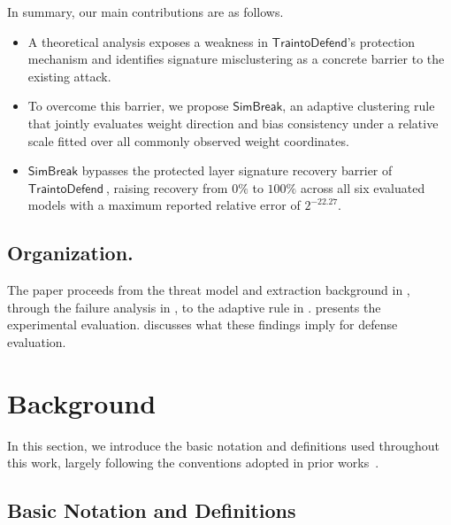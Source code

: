 \documentclass[runningheads]{llncs}
\newcommand{\td}{$\mathsf{Train to Defend}~$}
\newcommand{\nospacetd}{$\mathsf{Train to Defend}$}
\newcommand{\ours}{{$\mathsf{SimBreak}$}\xspace}
\begin{document}
In summary, our main contributions are as follows.
\begin{itemize}
\item A theoretical analysis exposes a weakness in \nospacetd's protection mechanism and identifies signature misclustering as a concrete barrier to the existing attack.

\item To overcome this barrier, we propose \ours{}, an adaptive clustering rule that jointly evaluates weight direction and bias consistency under a relative scale fitted over all commonly observed weight coordinates.
\item \ours{} bypasses the protected layer signature recovery barrier of \td, raising recovery from $0\%$ to $100\%$ across all six evaluated models with a maximum reported relative error of $2^{-22.27}$.
\end{itemize}

\subsection{Organization.}
\label{sec:organization}
The paper proceeds from the threat model and extraction background in , through the failure analysis in , to the adaptive rule in .
 presents the experimental evaluation.
 discusses what these findings imply for defense evaluation.


\section{Background}
In this section, we introduce the basic notation and definitions used throughout this work, largely following the conventions adopted in prior works~\cite{carlini_crypto_cea1,liu_eurocrypt_cea6}.
\label{sec:background}
\subsection{Basic Notation and Definitions}
\end{document}
